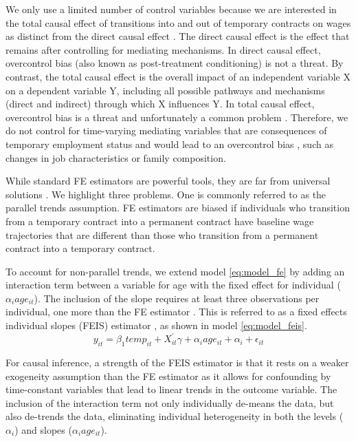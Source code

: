 \documentclass[12pt]{article}
\begin{document}
We only use a limited number of control variables because we are interested in the total causal effect of transitions into and out of temporary contracts on wages as distinct from the direct causal effect \citep{elwert_endogenous_2014}.  The direct causal effect is the effect that remains after controlling for mediating mechanisms.  In direct causal effect, overcontrol bias (also known as post-treatment conditioning) is not a threat.  By contrast, the total causal effect is the overall impact of an independent variable X on a dependent variable Y, including all possible pathways and mechanisms (direct and indirect) through which X influences Y.  In total causal effect, overcontrol bias is a threat and unfortunately a common problem \citep{lundberg_what_2021}.  Therefore, we do not control for time-varying mediating variables that are consequences of temporary employment status and would lead to an overcontrol bias  \citep{ludwig_what_2021}, such as changes in job characteristics or family composition.

While standard FE estimators are powerful tools, they are far from universal solutions \citep{collischon2020let}.  We highlight three problems.  One is commonly referred to as the parallel trends assumption.  FE estimators are biased if individuals who transition from a temporary contract into a permanent contract have baseline wage trajectories that are different than those who transition from a permanent contract into a temporary contract.  

To account for non-parallel trends, we extend model \ref{eq:model_fe} by adding an interaction term between a variable for age with the fixed effect for individual ($\alpha_i age_{it}$).  The inclusion of the slope requires at least three observations per individual, one more than the FE estimator \citep{ruttenauer_fixed_2020}.  This is referred to as a fixed effects individual slopes (FEIS) estimator  \citep{ludwig_is_2018}, as shown in model \ref{eq:model_feis}.  
\begin{equation}
    y_{it} = \beta_1 temp_{it} + X^\prime_{it} \gamma + \alpha_i age_{it} + \alpha_i + \epsilon_{it}
    \label{eq:model_feis}
\end{equation}

For causal inference, a strength of the FEIS estimator is that it rests on a weaker exogeneity assumption than the FE estimator as it allows for confounding by time-constant variables that lead to linear trends in the outcome variable. The inclusion of the interaction term not only individually de-means the data, but also de-trends the data, eliminating individual heterogeneity in both the levels ($\alpha_i$) and slopes ($\alpha_i age_{it}$).  
\end{document}
